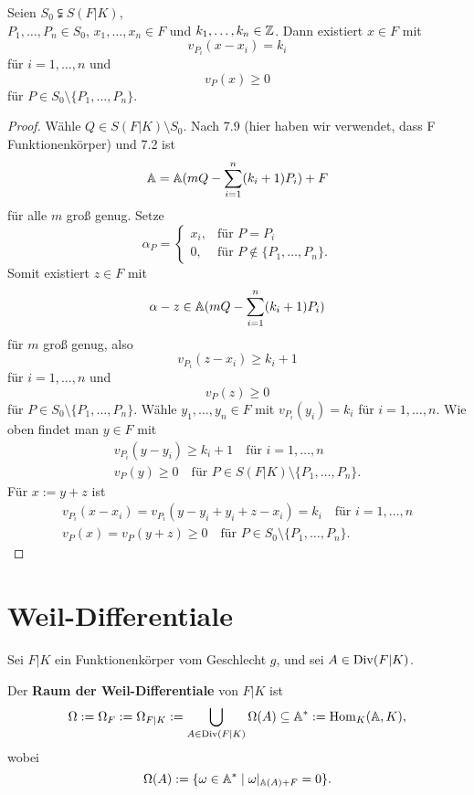 \begin{satz}
    Seien $S_0 \subsetneqq S(F|K)$,\\ $P_1,\ldots,P_n \in S_0$, $x_1,\ldots,x_n \in F$ und 
    $k_1, \ldots,k_n \in \mathbb{Z}$. Dann existiert $x \in F$ mit 
    $$ v_{P_i}(x-x_i) = k_i $$
    für $i=1,\ldots,n$ und
    $$ v_P (x) \geq 0 $$
    für $P \in S_0\setminus\{P_1, \ldots,P_n\}$.
\end{satz}
\begin{proof}
    Wähle $Q \in S(F|K)\setminus S_0$. Nach 7.9 (hier haben wir verwendet, dass F Funktionenkörper) und 7.2 ist
    $$ \mathbb{A} = \mathbb{A}(mQ - \sum\limits_{i=1}^n(k_i + 1)P_i) +F$$
    für alle $m$ groß genug.
    Setze
    $$ \alpha_P = \begin{cases}
        x_i, & \text{für } P=P_i\\
        0, & \text{für } P \notin \{P_1, \ldots, P_n\}.
    \end{cases}$$
    Somit existiert $z \in F$ mit 
    $$ \alpha - z \in \mathbb{A}(mQ - \sum\limits_{i=1}^n(k_i + 1)P_i)$$
    für $m$ groß genug, also
    $$v_{P_i}(z-x_i) \geq k_i + 1$$ für $i = 1, \ldots, n$ und
    $$v_P(z) \geq 0$$ für $P \in S_0\setminus\{P_1,\ldots,P_n\}$.
    Wähle $y_1,\ldots,y_n \in F$ mit $v_{P_i}(y_i) = k_i$ für $i=1,\ldots,n$.
    Wie oben findet man $y \in F$ mit
    \begin{align*}
        v_{P_i}(y-y_i) \geq k_i + 1 \quad \text{für } i=1,\ldots,n\\
        v_P(y) \geq 0 \quad \text{für } P \in S(F|K)\setminus\{P_1,\ldots,P_n\}.
    \end{align*}
    Für $x := y+z$ ist
    \begin{align*}
        v_{P_i}(x-x_i) = v_{P_i}(y-y_i + y_i + z - x_i) = k_i \quad \text{für } i = 1, \ldots,n\\
        v_P(x) = v_P(y+z) \geq 0 \quad \text{für } P \in S_0\setminus\{P_1,\ldots,P_n\}.
    \end{align*}
\end{proof}

\section{Weil-Differentiale}
Sei $F|K$ ein Funktionenkörper vom Geschlecht $g$, und sei $A \in \operatorname{Div}(F|K)$.

\begin{definition}
    Der \textbf{Raum der Weil-Differentiale} von $F|K$ ist
    $$ \Omega := \Omega_F := \Omega_{F|K} := \bigcup_{A \in \operatorname{Div}(F|K)}\Omega(A) \subseteq \mathbb{A}^\ast := \operatorname{Hom}_K(\mathbb{A},K),$$
    wobei
    $$ \Omega(A) := \{\omega \in \mathbb{A}^\ast \mid \omega|_{\mathbb{A}(A)+F}=0\}.$$
\end{definition}

